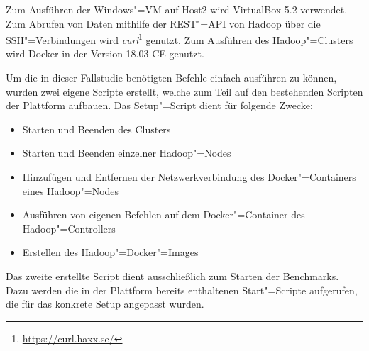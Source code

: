 Zum Ausführen der Windows"=VM auf Host2 wird VirtualBox 5.2 verwendet.
Zum Abrufen von Daten mithilfe der REST"=API von Hadoop über die SSH"=Verbindungen wird \emph{curl}\footnote{\url{https://curl.haxx.se/}} genutzt.
Zum Ausführen des Hadoop"=Clusters wird Docker in der Version 18.03 CE genutzt.

Um die in dieser Fallstudie benötigten Befehle einfach ausführen zu können, wurden zwei eigene Scripte erstellt, welche zum Teil auf den bestehenden Scripten der Plattform aufbauen.
Das Setup"=Script dient für folgende Zwecke:

\begin{itemize}
    \item Starten und Beenden des Clusters
    \item Starten und Beenden einzelner Hadoop"=Nodes
    \item Hinzufügen und Entfernen der Netzwerkverbindung des Docker"=Containers eines Hadoop"=Nodes
    \item Ausführen von eigenen Befehlen auf dem Docker"=Container des Hadoop"=Controllers
    \item Erstellen des Hadoop"=Docker"=Images
\end{itemize}

Das zweite erstellte Script dient ausschließlich zum Starten der Benchmarks.
Dazu werden die in der Plattform bereits enthaltenen Start"=Scripte aufgerufen, die für das konkrete Setup angepasst wurden.
